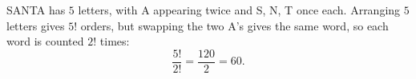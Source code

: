 SANTA has $5$ letters, with A appearing twice and S, N, T once each. Arranging $5$ letters gives $5!$ orders, but swapping the two A's gives the same word, so each word is counted $2!$ times:
\[
\dfrac{5!}{2!}=\dfrac{120}{2}=\boxed{60}.
\]
